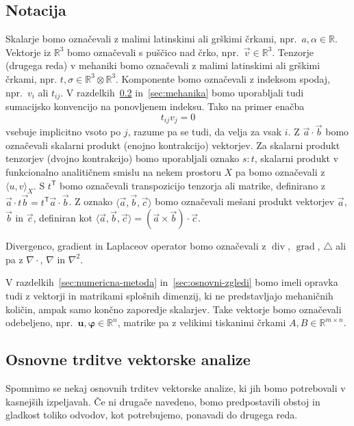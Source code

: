 \documentclass[12pt,a4paper,twoside]{article}
\theoremstyle{definition} %
\theoremstyle{plain} %
\numberwithin{equation}{section}
\newcommand{\R}{\mathbb R}
\newcommand{\T}{\mathsf{T}}
\newcommand{\lap}{\triangle}
\renewcommand{\div}{\operatorname{div}}
\newcommand{\grad}{\operatorname{grad}}
\renewcommand{\b}{\boldsymbol}
\renewcommand{\phi}{\varphi}
\newcommand{\vv}{\vec{v}}
\newcommand{\va}{\vec{a}}
\newcommand{\vc}{\vec{c}}
\newcommand{\vb}{\vec{b}}
\begin{document}
\subsection{Notacija}
Skalarje bomo označevali z malimi latinskimi ali grškimi črkami, npr.\ $a, \alpha
\in \R$. Vektorje iz $\R^3$ bomo označevali s puščico nad črko, npr.\ $\vv \in
\R^3$. Tenzorje (drugega reda) v mehaniki bomo označevali z malimi latinskimi ali grškimi
črkami, npr. $t, \sigma \in \R^3\otimes\R^3$.
Komponente bomo označevali z indeksom spodaj, npr.\ $v_i$ ali $t_{ij}$.
V razdelkih~\ref{sec:uvod-tenz} in~\ref{sec:mehanika} bomo
uporabljali tudi sumacijsko konvencijo na ponovljenem indeksu. Tako na primer enačba
\[
  t_{ij}v_j = 0
\]
vsebuje implicitno vsoto po $j$, razume pa se tudi, da velja za vsak $i$.  Z $\va\cdot\vb$ bomo
označevali skalarni produkt (enojno kontrakcijo) vektorjev. Za skalarni produkt tenzorjev (dvojno
kontrakcijo) bomo uporabljali oznako $s:t$, skalarni produkt v funkcionalno analitičnem smislu na
nekem prostoru $X$ pa bomo označevali z $\langle u, v\rangle_X$.  S $t^\T$ bomo označevali
transpozicijo tenzorja ali matrike, definirano z $\va\cdot t\vb = t^\T\va \cdot \vb$. Z oznako
$\langle \va, \vb, \vc\rangle$ bomo označevali mešani produkt vektorjev $\va$, $\vb$ in $\vc$,
definiran kot $\langle \va, \vb, \vc\rangle = (\va\times\vb)\cdot \vc$.

Divergenco, gradient in Laplaceov operator bomo označevali z $\div$, $\grad$,
$\lap$ ali pa z $\nabla\cdot$, $\nabla$ in $\nabla^2$.

V razdelkih~\ref{sec:numericna-metoda} in~\ref{sec:osnovni-zgledi} bomo imeli
opravka tudi z vektorji in matrikami splošnih dimenzij, ki ne predstavljajo
mehaničnih količin, ampak samo končno zaporedje skalarjev. Take vektorje bomo
označevali odebeljeno, npr.\ $\b u, \b\phi \in \R^{n}$, matrike pa z velikimi
tiskanimi črkami $A, B \in \R^{m\times n}$.

\subsection{Osnovne trditve vektorske analize}
\label{sec:uvod-tenz}
Spomnimo se nekaj osnovnih trditev vektorske analize, ki jih bomo
potrebovali v kasnejših izpeljavah. Če ni drugače navedeno, bomo predpostavili obstoj
in gladkost toliko odvodov, kot potrebujemo, ponavadi do drugega reda.
\end{document}
